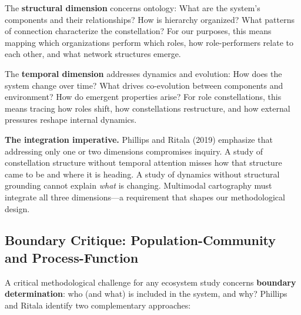 \documentclass[../main.tex]{subfiles}
\begin{document}
The \textbf{structural dimension} concerns ontology: What are the system's components and their relationships? How is hierarchy organized? What patterns of connection characterize the constellation? For our purposes, this means mapping which organizations perform which roles, how role-performers relate to each other, and what network structures emerge.

The \textbf{temporal dimension} addresses dynamics and evolution: How does the system change over time? What drives co-evolution between components and environment? How do emergent properties arise? For role constellations, this means tracing how roles shift, how constellations restructure, and how external pressures reshape internal dynamics.

\begin{importantbox}
\textbf{The integration imperative.} Phillips and Ritala (2019) emphasize that addressing only one or two dimensions compromises inquiry. A study of constellation structure without temporal attention misses how that structure came to be and where it is heading. A study of dynamics without structural grounding cannot explain \emph{what} is changing. Multimodal cartography must integrate all three dimensions---a requirement that shapes our methodological design.
\end{importantbox}

\subsection{Boundary Critique: Population-Community and Process-Function}

A critical methodological challenge for any ecosystem study concerns \textbf{boundary determination}: who (and what) is included in the system, and why? Phillips and Ritala identify two complementary approaches:
\end{document}
